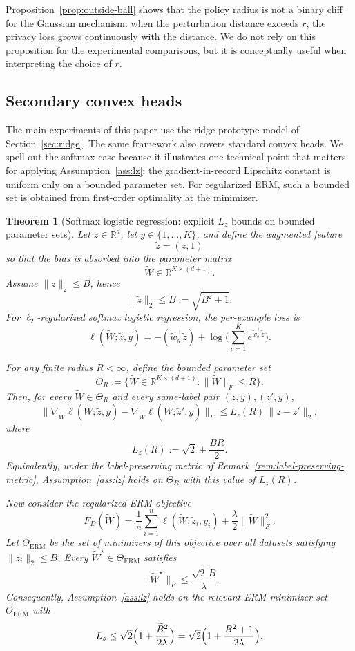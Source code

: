 \documentclass[conference,compsoc]{IEEEtran}
\newtheorem{theorem}{Theorem}
\begin{document}
Proposition~\ref{prop:outside-ball} shows that the policy radius is not a binary cliff for the Gaussian mechanism: when the perturbation distance exceeds $r$, the privacy loss grows continuously with the distance. We do not rely on this proposition for the experimental comparisons, but it is conceptually useful when interpreting the choice of $r$.

\subsection{Secondary convex heads}
\label{sec:secondary-heads}

The main experiments of this paper use the ridge-prototype model of Section~\ref{sec:ridge}. The same framework also covers standard convex heads. We spell out the softmax case because it illustrates one technical point that matters for applying Assumption~\ref{ass:lz}: the gradient-in-record Lipschitz constant is uniform only on a bounded parameter set. For regularized ERM, such a bounded set is obtained from first-order optimality at the minimizer.

\begin{theorem}[Softmax logistic regression: explicit $L_z$ bounds on bounded parameter sets]
\label{thm:softmax-lz}
Let $z\in\mathbb{R}^d$, let $y\in\{1,\dots,K\}$, and define the augmented feature
\[
\widetilde z=(z,1)
\]
so that the bias is absorbed into the parameter matrix
\[
\widetilde W\in\mathbb{R}^{K\times(d+1)}.
\]
Assume $\|z\|_2\le B$, hence
\[
\|\widetilde z\|_2\le \widetilde B:=\sqrt{B^2+1}.
\]
For $\ell_2$-regularized softmax logistic regression, the per-example loss is
\[
\ell(\widetilde W;\widetilde z,y)
=
-(\widetilde w_y^\top \widetilde z)
+
\log\!\Big(\sum_{c=1}^K e^{\widetilde w_c^\top \widetilde z}\Big).
\]

For any finite radius $R<\infty$, define the bounded parameter set
\[
\Theta_R
:=
\{\widetilde W\in\mathbb{R}^{K\times(d+1)}:\|\widetilde W\|_F\le R\}.
\]
Then, for every $\widetilde W\in\Theta_R$ and every same-label pair $(z,y),(z',y)$,
\[
\|\nabla_{\widetilde W}\ell(\widetilde W;\widetilde z,y)
-
\nabla_{\widetilde W}\ell(\widetilde W;\widetilde z',y)\|_F
\le
L_z(R)\,\|z-z'\|_2,
\]
where
\[
L_z(R):=\sqrt{2}+\frac{\widetilde B R}{2}.
\]
Equivalently, under the label-preserving metric of Remark~\ref{rem:label-preserving-metric}, Assumption~\ref{ass:lz} holds on $\Theta_R$ with this value of $L_z(R)$.

Now consider the regularized ERM objective
\[
F_D(\widetilde W)
=
\frac{1}{n}\sum_{i=1}^n
\ell(\widetilde W;\widetilde z_i,y_i)
+
\frac{\lambda}{2}\|\widetilde W\|_F^2.
\]
Let $\Theta_{\mathrm{ERM}}$ be the set of minimizers of this objective over all datasets satisfying $\|z_i\|_2\le B$. Every
$\widetilde W^\star\in\Theta_{\mathrm{ERM}}$ satisfies
\[
\|\widetilde W^\star\|_F
\le
\frac{\sqrt{2}\,\widetilde B}{\lambda}.
\]
Consequently, Assumption~\ref{ass:lz} holds on the relevant ERM-minimizer set $\Theta_{\mathrm{ERM}}$ with
\[
L_z
\le
\sqrt{2}\Bigl(1+\frac{\widetilde B^2}{2\lambda}\Bigr)
=
\sqrt{2}\Bigl(1+\frac{B^2+1}{2\lambda}\Bigr).
\]
\end{theorem}
\end{document}
